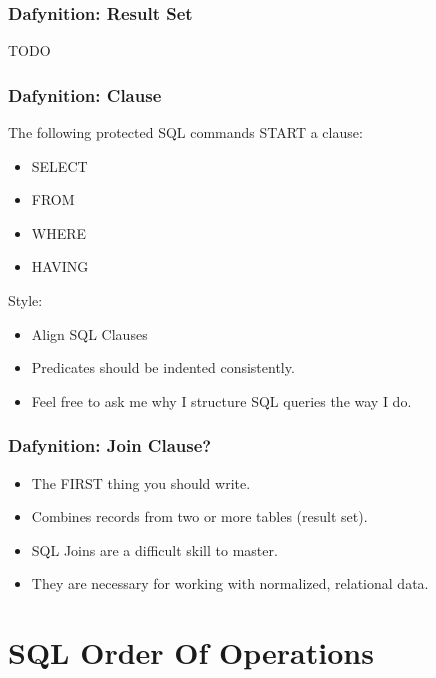 \documentclass{beamer}
\begin{document}
\begin{frame} %
  \frametitle{Dafynition: Result Set}

  TODO

\end{frame}  

\begin{frame} %
  \frametitle{Dafynition: Clause}
  
  The following protected SQL commands START a clause:
  \smallskip
  \begin{itemize}
  \item SELECT
  \item FROM
  \item WHERE
  \item HAVING
  \end{itemize}

  \bigskip
  \pause
  Style:
  \smallskip
  \begin{itemize}
  \item Align SQL Clauses
  \item Predicates should be indented consistently.
  \item Feel free to ask me why I structure SQL queries the way I do.
  \end{itemize}
  
\end{frame}  

\begin{frame} %
  \frametitle{Dafynition: Join Clause?}

  \begin{itemize}
  \item The FIRST thing you should write.
  \item Combines records from two or more tables (result set).
  \item SQL Joins are a difficult skill to master.
  \item They are necessary for working with normalized, relational
    data.
  \end{itemize}

\end{frame}  



\section{SQL Order Of Operations} %
\end{document}

